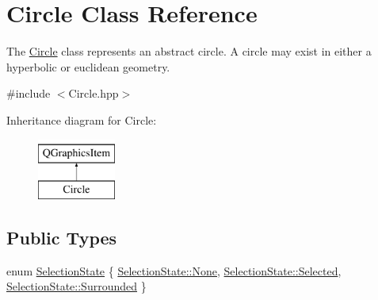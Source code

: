 \hypertarget{class_circle}{}\section{Circle Class Reference}
\label{class_circle}


The \hyperlink{class_circle}{Circle} class represents an abstract circle. A circle may exist in either a hyperbolic or euclidean geometry.  




{\ttfamily \#include $<$Circle.\+hpp$>$}

Inheritance diagram for Circle\+:\begin{figure}[H]
\begin{center}
\leavevmode
\includegraphics[height=2.000000cm]{class_circle}
\end{center}
\end{figure}
\subsection*{Public Types}
\begin{DoxyCompactItemize}
\item 
enum \hyperlink{class_circle_abaea7f437ac8e5519b3a69bce0848140}{Selection\+State} \{ \hyperlink{class_circle_abaea7f437ac8e5519b3a69bce0848140a6adf97f83acf6453d4a6a4b1070f3754}{Selection\+State\+::\+None}, 
\hyperlink{class_circle_abaea7f437ac8e5519b3a69bce0848140a91b442d385b54e1418d81adc34871053}{Selection\+State\+::\+Selected}, 
\hyperlink{class_circle_abaea7f437ac8e5519b3a69bce0848140a667b9fee30643bd8533437714aff2f69}{Selection\+State\+::\+Surrounded}
 \}
\end{DoxyCompactItemize}
